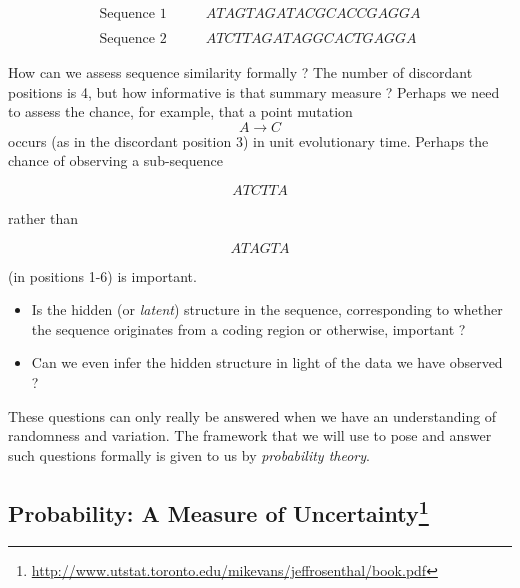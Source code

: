 \documentclass[]{book}
\providecommand{\tightlist}{%
  \setlength{\itemsep}{0pt}\setlength{\parskip}{0pt}}
\let\rmarkdownfootnote\footnote%
\def\footnote{\protect\rmarkdownfootnote}
\theoremstyle{definition}
\theoremstyle{definition}
\theoremstyle{definition}
\theoremstyle{remark}
\let\BeginKnitrBlock\begin \let\EndKnitrBlock\end
\begin{document}
\BeginKnitrBlock{example}[Two nucleotide sequences]
\protect\hypertarget{exm:unnamed-chunk-7}{}{\label{exm:unnamed-chunk-7}
{} }

\begin{equation*}
\begin{array}{ll}
\text{{Sequence 1}}{\qquad } & ATAGTAGATACGCACCGAGGA \\
&  \\
\text{{Sequence 2}}{\qquad } & ATCTTAGATAGGCACTGAGGA
\end{array}
\end{equation*}

How can we assess sequence similarity formally ? The number of
discordant positions is 4, but how informative is that summary measure ?
Perhaps we need to assess the chance, for example, that a point mutation
\[ A\rightarrow C \] occurs (as in the discordant position 3) in unit
evolutionary time. Perhaps the chance of observing a sub-sequence

\begin{equation*}
ATCTTA
\end{equation*}

rather than

\begin{equation*}
ATAGTA
\end{equation*}

(in positions 1-6) is important.

\begin{itemize}
\tightlist
\item
  Is the hidden (or \emph{latent}) structure in the sequence,
  corresponding to whether the sequence originates from a coding region
  or otherwise, important ?
\item
  Can we even infer the hidden structure in light of the data we have
  observed ?\\
\end{itemize}
\EndKnitrBlock{example}

These questions can only really be answered when we have an
understanding of randomness and variation. The framework that we will
use to pose and answer such questions formally is given to us by
\emph{probability theory}.

\subsection*{\texorpdfstring{Probability: A Measure of
Uncertainty\footnote{\url{http://www.utstat.toronto.edu/mikevans/jeffrosenthal/book.pdf}}}{Probability: A Measure of Uncertainty}}\label{probability-a-measure-of-uncertainty2}
\end{document}
